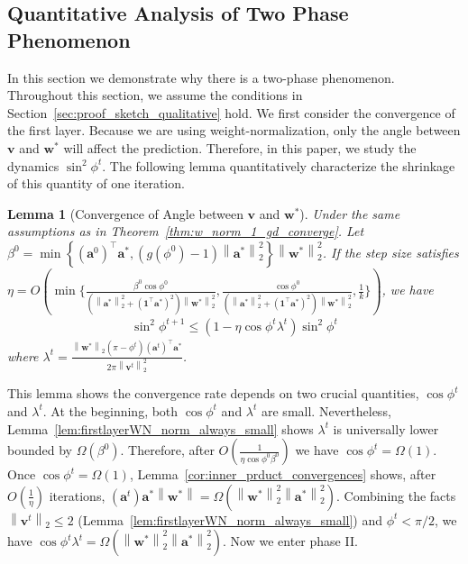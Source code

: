\documentclass{article}
\newcommand{\firstlayer}{w}
\newcommand{\firstlayerWN}{v}
\newcommand{\secondlayer}{a}
\newcommand{\vect}[1]{\mathbf{#1}}
\newcommand{\norm}[1]{\left\|#1\right\|}
\newtheorem{lem}{Lemma}[section]
\begin{document}
\subsection{Quantitative Analysis of Two Phase Phenomenon}\label{sec:proof_sketch_quantitative}
In this section we demonstrate why there is a two-phase phenomenon.
Throughout this section, we assume the conditions in Section~\ref{sec:proof_sketch_qualitative} hold.
We first consider the convergence of the first layer.
Because we are using weight-normalization, only the angle between $\vect{\firstlayerWN}$ and $\vect{\firstlayer}^*$ will affect the prediction.
Therefore, in this paper, we study the dynamics $\sin^2\phi^t$.
The following lemma quantitatively characterize the shrinkage of this quantity of one iteration.
\begin{lem}[Convergence of Angle between $\vect{\firstlayerWN}$ and $\vect{\firstlayer}^*$]\label{lem:first_layer_convergence_one_iter}
	Under the same assumptions as in Theorem~\ref{thm:w_norm_1_gd_converge}.
	Let $\beta^0 = \min\left\{\left(\vect{\secondlayer}^0\right)^\top \vect{\secondlayer}^*,\left(g(\phi^0)-1\right)\norm{\vect{\secondlayer}^*}_2^2\right\}\norm{\vect{\firstlayer}^*}_2^2$.
	If the step size satisfies
	$\eta = O
	( \min\{\frac{\beta^0\cos\phi^0}{\left(\norm{\vect{\secondlayer}^*}_2^2+\left(\vect{1}^\top \vect{\secondlayer}^*\right)^2\right)\norm{\vect{\firstlayer}^*}_2^2}, \frac{\cos\phi^0}{\left(\norm{\vect{\secondlayer}^*}_2^2+\left(\vect{1}^\top \vect{\secondlayer}^*\right)^2\right)\norm{\vect{\firstlayer}^*}_2^2},\frac{1}{k}\})$, we have \begin{align*}
	\sin^2\phi^{t+1} \le \left(1-\eta\cos\phi^t\lambda^t\right)\sin^2\phi^t
	\end{align*}  where $\lambda^t = \frac{\norm{\vect{\firstlayer}^*}_2\left(\pi-\phi^t\right)\left(\vect{\secondlayer}^t\right)^\top\vect{\secondlayer}^*}{2\pi\norm{\vect{\firstlayerWN}^t}_2^2}$.
\end{lem}
This lemma shows the convergence rate depends on two crucial quantities, $\cos \phi^t$ and $\lambda^t$.
At the beginning, both $\cos\phi^t$ and $\lambda^t$ are small.
Nevertheless, Lemma~\ref{lem:firstlayerWN_norm_always_small} shows $\lambda^t$ is universally lower bounded by $\Omega\left(\beta^0\right)$.
Therefore, after $O(\frac{1}{\eta\cos\phi^0 \beta^0})$ we have $\cos\phi^t = \Omega\left(1\right)$.
Once $\cos\phi^t = \Omega\left(1\right)$, Lemma~\ref{cor:inner_prduct_convergences} shows, after $O\left(\frac{1}{\eta}\right)$ iterations, $\left(\vect{\secondlayer}^t\right)\vect{\secondlayer}^*\norm{\vect{\firstlayer}^*} = \Omega\left(\norm{\vect{\firstlayer}^*}_2^2\norm{\vect{\secondlayer}^*}_2^2\right)$.
Combining the facts $\norm{\vect{\firstlayerWN}^t}_2 \le 2$ (Lemma~\ref{lem:firstlayerWN_norm_always_small}) and $\phi^t < \pi/2$, we have $\cos\phi^t\lambda^t = \Omega\left(\norm{\vect{\firstlayer}^*}_2^2\norm{\vect{\secondlayer}^*}_2^2\right)$.
Now we enter phase II.
\end{document}

